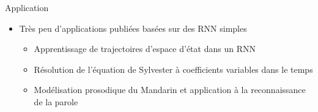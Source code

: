 \begin{frame}{Application}
	\begin{itemize}
	\item Très peu d'applications publiées basées sur des RNN simples
		\begin{itemize}
			\item Apprentissage de trajectoires d'espace d'état dans un RNN \cite{Pearlmutter89}
			\item Résolution de l'équation de Sylvester à coefficients variables dans le temps \cite{Zhang02}
			\item Modélisation prosodique du Mandarin et application à la reconnaissance de la parole \cite{Wang02}
		\end{itemize}
	\end{itemize}	

\end{frame}
